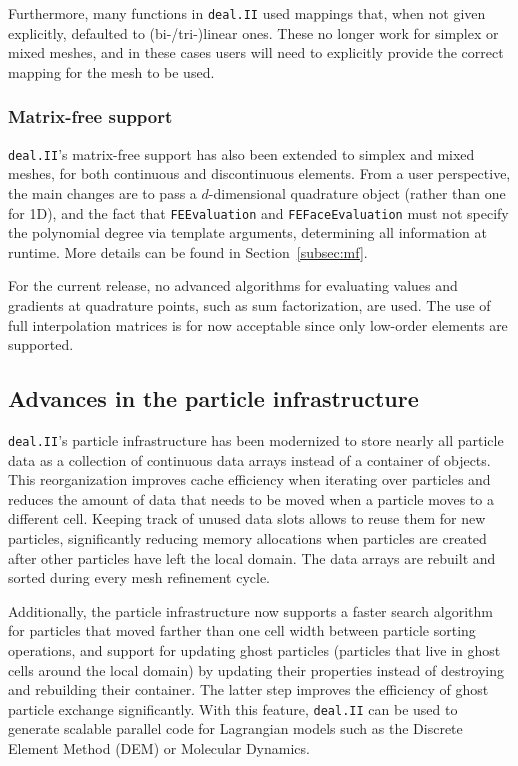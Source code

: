 \documentclass{ansarticle-preprint}
\newcommand{\specialword}[1]{\texttt{#1}}
\newcommand{\dealii}{{\specialword{deal.II}}\xspace}
\begin{document}
Furthermore, many functions in \dealii{} used mappings that, when not
given explicitly, defaulted to (bi-/tri-)linear ones. These no longer
work for simplex or mixed meshes, and in these cases users will need
to explicitly provide the correct mapping for the mesh to be used.


\subsubsection{Matrix-free support}

\dealii{}'s matrix-free support has also been extended to simplex and
mixed meshes, for both
continuous and discontinuous elements. From a user perspective, the main
changes are to pass a $d$-dimensional quadrature object (rather than
one for 1D),
and the fact that \texttt{FEEvaluation} and \texttt{FEFaceEvaluation} must not
specify the polynomial degree via template arguments, determining all
information at runtime. More details can be found in
Section~\ref{subsec:mf}.

For the current release, no advanced algorithms for evaluating values and
gradients at quadrature points, such as sum factorization, are used.
The use of full interpolation matrices is for now acceptable since only low-order elements are
supported.



\subsection{Advances in the particle infrastructure}
\label{subsec:particles}

\dealii 's particle infrastructure has been modernized to store nearly all
particle data as a collection of continuous data arrays instead of a container of
objects. This reorganization improves cache efficiency when iterating over
particles and reduces the amount of data that needs to be moved when a particle
moves to a different cell. Keeping track of unused data slots allows to reuse
them for new particles, significantly reducing memory allocations when
particles are created after other particles have left the local domain. The
data arrays are rebuilt and sorted during every mesh refinement cycle.

Additionally, the particle infrastructure now supports a faster search algorithm
for particles that moved farther than one cell width between particle sorting
operations, and support for updating ghost particles (particles that live in
ghost cells around the local domain) by updating their properties instead of
destroying and rebuilding their container. The latter step improves the
efficiency of ghost particle exchange significantly. With this feature,
\dealii can be used to generate scalable parallel code for Lagrangian
models such as the Discrete Element Method (DEM) \cite{golshan2021lethedem}
or Molecular Dynamics.
\end{document}
